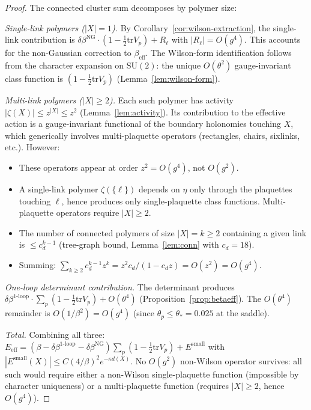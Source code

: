 \documentclass[11pt]{article}
\theoremstyle{definition}
\newcommand{\SU}{\mathrm{SU}}
\newcommand{\tr}{\mathrm{tr}}
\begin{document}
\begin{proof}
The connected cluster sum decomposes by polymer size:

\emph{Single-link polymers ($|X|=1$).}
By Corollary~\ref{cor:wilson-extraction}, the single-link
contribution is $\delta\beta^{\mathrm{NG}}\cdot(1-\frac{1}{2}\tr V_p)
+R_\ell$ with $|R_\ell|=O(g^4)$.  This accounts for the
non-Gaussian correction to $\beta_{\mathrm{eff}}$.
The Wilson-form identification follows from the character
expansion on $\SU(2)$: the unique $O(\theta^2)$ gauge-invariant
class function is $(1-\frac{1}{2}\tr V_p)$
(Lemma~\ref{lem:wilson-form}).

\emph{Multi-link polymers ($|X|\ge 2$).}
Each such polymer has activity $|\zeta(X)|\le z^{|X|}\le z^2$
(Lemma~\ref{lem:activity}).  Its contribution to the effective
action is a gauge-invariant functional of the boundary holonomies
touching $X$, which generically involves multi-plaquette operators
(rectangles, chairs, sixlinks, etc.).  However:
\begin{itemize}[nosep]
\item These operators appear at order $z^2=O(g^4)$, not $O(g^2)$.
\item A single-link polymer $\zeta(\{\ell\})$ depends on $\eta$
only through the plaquettes touching $\ell$, hence produces
only single-plaquette class functions.
Multi-plaquette operators require $|X|\ge 2$.
\item The number of connected polymers of size $|X|=k\ge 2$
containing a given link is $\le c_d^{k-1}$ (tree-graph bound,
Lemma~\ref{lem:conn} with $c_d=18$).
\item Summing: $\sum_{k\ge 2}c_d^{k-1}z^k
=z^2 c_d/(1-c_d z)=O(z^2)=O(g^4)$.
\end{itemize}

\emph{One-loop determinant contribution.}
The determinant produces $\delta\beta^{1\text{-loop}}\cdot
\sum_p(1-\frac{1}{2}\tr V_p)+O(\theta^4)$
(Proposition~\ref{prop:betaeff}).  The $O(\theta^4)$ remainder
is $O(1/\beta^2)=O(g^4)$ (since $\theta_p\le\theta_*=0.025$
at the saddle).

\emph{Total.}
Combining all three:
$E_{\mathrm{eff}}=(\beta-\delta\beta^{1\text{-loop}}
-\delta\beta^{\mathrm{NG}})\sum_p(1-\frac{1}{2}\tr V_p)
+E^{\mathrm{small}}$ with
$|E^{\mathrm{small}}(X)|\le C(4/\beta)^2 e^{-\kappa d(X)}$.
No $O(g^2)$ non-Wilson operator survives: all such would require
either a non-Wilson single-plaquette function (impossible by
character uniqueness) or a multi-plaquette function (requires
$|X|\ge 2$, hence $O(g^4)$).
\end{proof}
\end{document}
